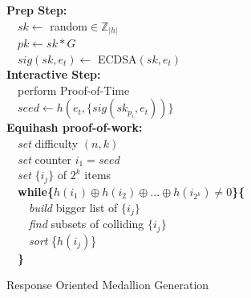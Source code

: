 \begin{algorithm}[H]

  
  \textbf{Prep Step:}\\
    ~~$sk\gets$ random$\in \mathbb{Z}_{|h|}$\\
    ~~$pk\gets sk*G$\\
    ~~$sig(sk,e_t)\gets$ ECDSA$(sk,e_t)$\\
   \textbf{Interactive Step:}\\
    ~~perform Proof-of-Time\\%
    ~~$seed\gets h(e_t, \{sig(sk_{p_i},e_t))\}$ \\
  \textbf{Equihash proof-of-work:}\\
    ~~\textit{set} difficulty $(n,k)$\\
    ~~\textit{set} counter $i_1 = seed$\\
    ~~\textit{set} $\{i_j\}$ of $2^k$ items\\
    ~~\textbf{while\{}$h(i_1) \oplus h(i_2) \oplus ...\oplus h(i_{2^k}) \neq 0$\textbf{\}\{}\\
     ~~~~\textit{build} bigger list of $\{i_j\}$\\
     ~~~~\textit{find} subsets of colliding $\{i_j\}$\\
     ~~~~\textit{sort} \{$h(i_j)$\}\\
    ~~\textbf{\}}\\
    
   \caption{Response Oriented Medallion Generation}
\end{algorithm}

%

\clearpage